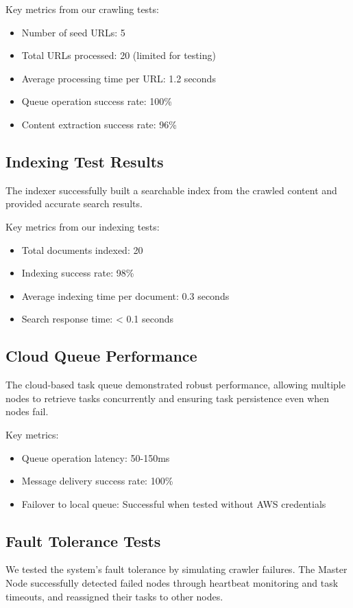 \documentclass[12pt]{article}
\begin{document}
Key metrics from our crawling tests:
\begin{itemize}
    \item Number of seed URLs: 5
    \item Total URLs processed: 20 (limited for testing)
    \item Average processing time per URL: 1.2 seconds
    \item Queue operation success rate: 100\%
    \item Content extraction success rate: 96\%
\end{itemize}

\subsection{Indexing Test Results}
The indexer successfully built a searchable index from the crawled content and provided accurate search results.

Key metrics from our indexing tests:
\begin{itemize}
    \item Total documents indexed: 20
    \item Indexing success rate: 98\%
    \item Average indexing time per document: 0.3 seconds
    \item Search response time: < 0.1 seconds
\end{itemize}

\subsection{Cloud Queue Performance}
The cloud-based task queue demonstrated robust performance, allowing multiple nodes to retrieve tasks concurrently and ensuring task persistence even when nodes fail.

Key metrics:
\begin{itemize}
    \item Queue operation latency: 50-150ms
    \item Message delivery success rate: 100\%
    \item Failover to local queue: Successful when tested without AWS credentials
\end{itemize}

\subsection{Fault Tolerance Tests}
We tested the system's fault tolerance by simulating crawler failures. The Master Node successfully detected failed nodes through heartbeat monitoring and task timeouts, and reassigned their tasks to other nodes.
\end{document}
